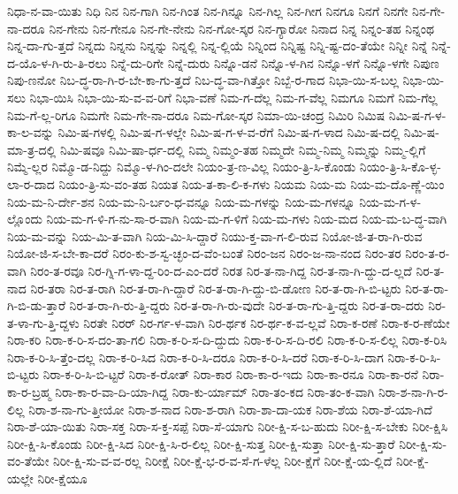{ನಿಧಾ-ನ-ವಾ-ಯಿತು
ನಿಧಿ
ನಿನ
ನಿನ-ಗಾಗಿ
ನಿನ-ಗಿಂತ
ನಿನ-ಗಿನ್ನೂ
ನಿನ-ಗಿಲ್ಲ
ನಿನ-ಗೀಗ
ನಿನಗೂ
ನಿನಗೆ
ನಿನಗೇ
ನಿನ-ಗೇ-ನಾ-ದರೂ
ನಿನ-ಗೇನು
ನಿನ-ಗೇನೂ
ನಿನ-ಗೇ-ನೇನು
ನಿನ-ಗೋ-ಸ್ಕರ
ನಿನ-ಗ್ಯಾರೋ
ನಿನಾದ
ನಿನ್ನ
ನಿನ್ನಂ-ತಹ
ನಿನ್ನಂಥ
ನಿನ್ನ-ದಾ-ಗು-ತ್ತದೆ
ನಿನ್ನದು
ನಿನ್ನನು
ನಿನ್ನನ್ನು
ನಿನ್ನಲ್ಲಿ
ನಿನ್ನ-ಲ್ಲಿಯೆ
ನಿನ್ನಿಂದ
ನಿನ್ನಿಷ್ಟ
ನಿನ್ನಿ-ಷ್ಟ-ದಂ-ತೆಯೇ
ನಿನ್ನೀ
ನಿನ್ನೆ
ನಿನ್ನೆ-ದ-ಯೊ-ಳ-ಗಿ-ರು-ತಿ-ರಲು
ನಿನ್ನೆ-ದು-ರಿಗೇ
ನಿನ್ನೆ-ದುರು
ನಿನ್ನೊ-ಡನೆ
ನಿನ್ನೊ-ಳ-ಗಿನ
ನಿನ್ನೊ-ಳಗೆ
ನಿನ್ನೊ-ಳಗೇ
ನಿಪುಣ
ನಿಪು-ಣನೋ
ನಿಬ-ದ್ಧ-ರಾ-ಗಿ-ರ-ಬೇ-ಕಾ-ಗು-ತ್ತದೆ
ನಿಬ-ದ್ಧ-ವಾ-ಗಿತ್ತೋ
ನಿಬ್ಬೆ-ರ-ಗಾದ
ನಿಭಾ-ಯಿ-ಸ-ಬಲ್ಲ
ನಿಭಾ-ಯಿ-ಸಲು
ನಿಭಾ-ಯಿಸಿ
ನಿಭಾ-ಯಿ-ಸು-ವ-ವ-ರಿಗೆ
ನಿಭಾ-ವಣೆ
ನಿಮ-ಗ-ದೆಲ್ಲ
ನಿಮ-ಗ-ವೆಲ್ಲ
ನಿಮಗೂ
ನಿಮಗೆ
ನಿಮ-ಗೆಲ್ಲ
ನಿಮ-ಗೆ-ಲ್ಲ-ರಿಗೂ
ನಿಮಗೇ
ನಿಮ-ಗೇ-ನಾ-ದರೂ
ನಿಮ-ಗೋ-ಸ್ಕರ
ನಿಮಾ-ಯಿ-ಚಂದ್ರ
ನಿಮಿರಿ
ನಿಮಿಷ
ನಿಮಿ-ಷ-ಗ-ಳ-ಕಾ-ಲ-ವನ್ನು
ನಿಮಿ-ಷ-ಗಳಲ್ಲಿ
ನಿಮಿ-ಷ-ಗ-ಳಲ್ಲೇ
ನಿಮಿ-ಷ-ಗ-ಳ-ವ-ರೆಗೆ
ನಿಮಿ-ಷ-ಗ-ಳಾದ
ನಿಮಿ-ಷ-ದಲ್ಲಿ
ನಿಮಿ-ಷ-ಮಾ-ತ್ರ-ದಲ್ಲಿ
ನಿಮಿ-ಷವೂ
ನಿಮಿ-ಷಾ-ರ್ಧ-ದಲ್ಲಿ
ನಿಮ್ಮ
ನಿಮ್ಮಂ-ತಹ
ನಿಮ್ಮದೇ
ನಿಮ್ಮ-ನಿಮ್ಮ
ನಿಮ್ಮನ್ನು
ನಿಮ್ಮ-ಲ್ಲಿಗೆ
ನಿಮ್ಮೆ-ಲ್ಲರ
ನಿಮ್ಮೊ-ಡ-ನಿದ್ದು
ನಿಮ್ಮೊ-ಳ-ಗಿಂ-ದಲೇ
ನಿಯಂ-ತ್ರ-ಣ-ವಿಲ್ಲ
ನಿಯಂ-ತ್ರಿ-ಸಿ-ಕೊಂಡು
ನಿಯಂ-ತ್ರಿ-ಸಿ-ಕೊ-ಳ್ಳ-ಲಾ-ರ-ದಾದ
ನಿಯಂ-ತ್ರಿ-ಸು-ವಂ-ತಹ
ನಿಯತ
ನಿಯ-ತ-ಕಾ-ಲಿ-ಕ-ಗಳು
ನಿಯಮ
ನಿಯ-ಮ
ನಿಯ-ಮ-ದೊ-ಣ್ಣೆ-ಯಿಂ
ನಿಯ-ಮ-ನಿ-ರ್ದೇ-ಶನ
ನಿಯ-ಮ-ನಿ-ರ್ಬಂ-ಧ-ವನ್ನೂ
ನಿಯ-ಮ-ಗಳನ್ನು
ನಿಯ-ಮ-ಗಳನ್ನೂ
ನಿಯ-ಮ-ಗ-ಳ-ಲ್ಲೊಂದು
ನಿಯ-ಮ-ಗ-ಳಿ-ಗ-ನು-ಸಾ-ರ-ವಾಗಿ
ನಿಯ-ಮ-ಗ-ಳಿಗೆ
ನಿಯ-ಮ-ಗಳು
ನಿಯ-ಮದ
ನಿಯ-ಮ-ಬ-ದ್ಧ-ವಾಗಿ
ನಿಯ-ಮ-ವನ್ನು
ನಿಯ-ಮಿ-ತ-ವಾಗಿ
ನಿಯ-ಮಿ-ಸಿ-ದ್ದಾರೆ
ನಿಯು-ಕ್ತ-ವಾ-ಗ-ಲಿ-ರುವ
ನಿಯೋ-ಜಿ-ತ-ರಾ-ಗಿ-ರುವ
ನಿಯೋ-ಜಿ-ಸ-ಬೇ-ಕಾ-ದರೆ
ನಿರಂ-ಕು-ಶ-ಸ್ವ-ಚ್ಛಂ-ದ-ವೆಂ-ಬಂತೆ
ನಿರಂ-ಜನ
ನಿರಂ-ಜ-ನಾ-ನಂದ
ನಿರಂ-ತರ
ನಿರಂ-ತ-ರ-ವಾಗಿ
ನಿರಂ-ತ-ರವೂ
ನಿರ-ಗ್ನಿ-ಗ-ಳಾ-ದ್ದ-ರಿಂ-ದ-ಎಂ-ದರೆ
ನಿರತ
ನಿರ-ತ-ನಾ-ಗಿದ್ದ
ನಿರ-ತ-ನಾ-ಗಿ-ದ್ದು-ದ-ಲ್ಲದೆ
ನಿರ-ತ-ನಾದ
ನಿರ-ತರಾ
ನಿರ-ತ-ರಾಗಿ
ನಿರ-ತ-ರಾ-ಗಿ-ದ್ದಾರೆ
ನಿರ-ತ-ರಾ-ಗಿ-ದ್ದು-ಬಿ-ಡೋಣ
ನಿರ-ತ-ರಾ-ಗಿ-ಬಿ-ಟ್ಟರು
ನಿರ-ತ-ರಾ-ಗಿ-ಬಿ-ಡು-ತ್ತಾರೆ
ನಿರ-ತ-ರಾ-ಗಿ-ರು-ತ್ತಿ-ದ್ದರು
ನಿರ-ತ-ರಾ-ಗಿ-ರು-ವುದೇ
ನಿರ-ತ-ರಾ-ಗು-ತ್ತಿ-ದ್ದರು
ನಿರ-ತ-ರಾ-ದರು
ನಿರ-ತ-ಳಾ-ಗು-ತ್ತಿ-ದ್ದಳು
ನಿರತೇ
ನಿರರ್
ನಿರ-ರ್ಗ-ಳ-ವಾಗಿ
ನಿರ-ರ್ಥಕ
ನಿರ-ರ್ಥ-ಕ-ವ-ಲ್ಲವೆ
ನಿರಾ-ಕ-ರಣೆ
ನಿರಾ-ಕ-ರ-ಣೆಯೇ
ನಿರಾ-ಕರಿ
ನಿರಾ-ಕ-ರಿ-ಸ-ದಂ-ತಾ-ಗಲಿ
ನಿರಾ-ಕ-ರಿ-ಸ-ದಿ-ದ್ದುದು
ನಿರಾ-ಕ-ರಿ-ಸ-ದಿ-ರಲಿ
ನಿರಾ-ಕ-ರಿ-ಸ-ಲಿಲ್ಲ
ನಿರಾ-ಕ-ರಿಸಿ
ನಿರಾ-ಕ-ರಿ-ಸಿ-ತ್ತೆಂ-ದಲ್ಲ
ನಿರಾ-ಕ-ರಿ-ಸಿದ
ನಿರಾ-ಕ-ರಿ-ಸಿ-ದರೂ
ನಿರಾ-ಕ-ರಿ-ಸಿ-ದರೆ
ನಿರಾ-ಕ-ರಿ-ಸಿ-ದಾಗ
ನಿರಾ-ಕ-ರಿ-ಸಿ-ಬಿ-ಟ್ಟರು
ನಿರಾ-ಕ-ರಿ-ಸಿ-ಬಿ-ಟ್ಟರೆ
ನಿರಾ-ಕ-ರೋತ್
ನಿರಾ-ಕಾರ
ನಿರಾ-ಕಾ-ರ-ಇದು
ನಿರಾ-ಕಾ-ರನೂ
ನಿರಾ-ಕಾ-ರನೆ
ನಿರಾ-ಕಾ-ರ-ಬ್ರಹ್ಮ
ನಿರಾ-ಕಾ-ರ-ವಾ-ದಿ-ಯಾ-ಗಿದ್ದ
ನಿರಾ-ಕು-ರ್ಯಾಮ್
ನಿರಾ-ತಂ-ಕದ
ನಿರಾ-ತಂ-ಕ-ವಾಗಿ
ನಿರಾ-ಶ-ನಾ-ಗಿ-ರ-ಲಿಲ್ಲ
ನಿರಾ-ಶ-ನಾ-ಗು-ತ್ತೀಯೋ
ನಿರಾ-ಶ-ನಾದ
ನಿರಾ-ಶ-ರಾಗಿ
ನಿರಾ-ಶಾ-ದಾ-ಯಕ
ನಿರಾ-ಶೆಯ
ನಿರಾ-ಶೆ-ಯಾ-ಗಿದೆ
ನಿರಾ-ಶೆ-ಯಾ-ಯಿತು
ನಿರಾ-ಸಕ್ತ
ನಿರಾ-ಸ-ಕ್ತ-ಸಪ್ಪೆ
ನಿರಾ-ಸೆ-ಯಾಗು
ನಿರೀ-ಕ್ಷಿ-ಸ-ಬ-ಹುದು
ನಿರೀ-ಕ್ಷಿ-ಸ-ಬೇಕು
ನಿರೀ-ಕ್ಷಿಸಿ
ನಿರೀ-ಕ್ಷಿ-ಸಿ-ಕೊಂಡು
ನಿರೀ-ಕ್ಷಿ-ಸಿದ
ನಿರೀ-ಕ್ಷಿ-ಸಿ-ರ-ಲಿಲ್ಲ
ನಿರೀ-ಕ್ಷಿ-ಸುತ್ತ
ನಿರೀ-ಕ್ಷಿ-ಸುತ್ತಾ
ನಿರೀ-ಕ್ಷಿ-ಸು-ತ್ತಾರೆ
ನಿರೀ-ಕ್ಷಿ-ಸು-ವಂ-ತೆಯೇ
ನಿರೀ-ಕ್ಷಿ-ಸು-ವ-ವ-ರಲ್ಲ
ನಿರೀಕ್ಷೆ
ನಿರೀ-ಕ್ಷೆ-ಭ-ರ-ವ-ಸೆ-ಗ-ಳೆಲ್ಲ
ನಿರೀ-ಕ್ಷೆಗೆ
ನಿರೀ-ಕ್ಷೆ-ಯ-ಲ್ಲಿದೆ
ನಿರೀ-ಕ್ಷೆ-ಯಲ್ಲೇ
ನಿರೀ-ಕ್ಷೆಯೂ
}
